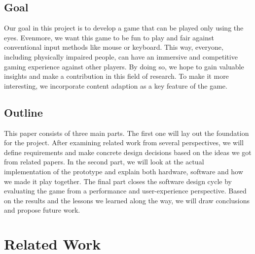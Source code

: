 \documentclass{sigchi}
\begin{document}
\subsection{Goal}
Our goal in this project is to develop a game that can be played only using the eyes. Evenmore, we want this game to be fun to play and fair against conventional input methods like mouse or keyboard. This way, everyone, including physically impaired people, can have an immersive and competitive gaming experience against other players. By doing so, we hope to gain valuable insights and make a contribution in this field of research. To make it more interesting, we incorporate content adaption as a key feature of the game.

\subsection{Outline}
This paper consists of three main parts. The first one will lay out the foundation for the project. After examining related work from several perspectives, we will define requirements and make concrete design decisions based on the ideas we got from related papers. In the second part, we will look at the actual implementation of the prototype and explain both hardware, software and how we made it play together. The final part closes the software design cycle by evaluating the game from a performance and user-experience perspective. Based on the results and the lessons we learned along the way, we will draw conclusions and propose future work.

\section{Related Work}
\end{document}

